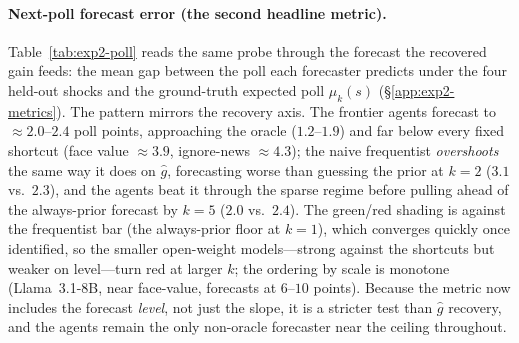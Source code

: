 \documentclass{article} %
\begin{document}
\paragraph{Next-poll forecast error (the second headline metric).}  Table~\ref{tab:exp2-poll} reads
the same probe through the forecast the recovered gain feeds: the mean gap between the poll each
forecaster predicts under the four held-out shocks and the ground-truth expected poll $\mu_k(s)$
(\S\ref{app:exp2-metrics}).  The pattern mirrors the recovery axis.  The frontier agents forecast to
$\approx2.0$--$2.4$ poll points, approaching the oracle ($1.2$--$1.9$) and far below every fixed
shortcut (face value $\approx3.9$, ignore-news $\approx4.3$); the naive frequentist \emph{overshoots}
the same way it does on $\hat g$, forecasting worse than guessing the prior at $k{=}2$ ($3.1$ vs.\
$2.3$), and the agents beat it through the sparse regime before pulling ahead of the always-prior
forecast by $k{=}5$ ($2.0$ vs.\ $2.4$).  The green/red shading is against the frequentist bar (the
always-prior floor at $k{=}1$), which converges quickly once identified, so the smaller open-weight
models---strong against the shortcuts but weaker on level---turn red at larger $k$; the ordering by
scale is monotone (Llama~3.1-8B, near face-value, forecasts at $6$--$10$ points).  Because the metric
now includes the forecast \emph{level}, not just the slope, it is a stricter test than $\hat g$
recovery, and the agents remain the only non-oracle forecaster near the ceiling throughout.
\end{document}
